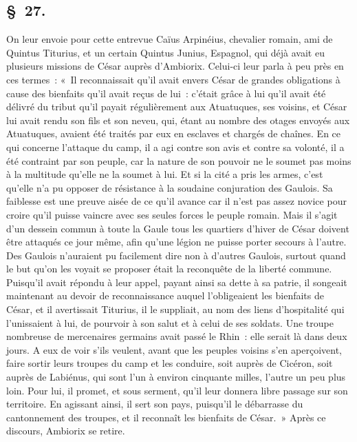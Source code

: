 \documentclass[french,twoside]{book} %
\begin{document}
\subsection[{§ 27.}]{ \textsc{§ 27.} }
\noindent On leur envoie pour cette entrevue Caïus Arpinéius, chevalier romain, ami de Quintus Titurius, et un certain Quintus Junius, Espagnol, qui déjà avait eu plusieurs missions de César auprès d’Ambiorix. Celui-ci leur parla à peu près en ces termes : « Il reconnaissait qu’il avait envers César de grandes obligations à cause des bienfaits qu’il avait reçus de lui : c’était grâce à lui qu’il avait été délivré du tribut qu’il payait régulièrement aux Atuatuques, ses voisins, et César lui avait rendu son fils et son neveu, qui, étant au nombre des otages envoyés aux Atuatuques, avaient été traités par eux en esclaves et chargés de chaînes. En ce qui concerne l’attaque du camp, il a agi contre son avis et contre sa volonté, il a été contraint par son peuple, car la nature de son pouvoir ne le soumet pas moins à la multitude qu’elle ne la soumet à lui. Et si la cité a pris les armes, c’est qu’elle n’a pu opposer de résistance à la soudaine conjuration des Gaulois. Sa faiblesse est une preuve aisée de ce qu’il avance car il n’est pas assez novice pour croire qu’il puisse vaincre avec ses seules forces le peuple romain. Mais il s’agit d’un dessein commun à toute la Gaule tous les quartiers d’hiver de César doivent être attaqués ce jour même, afin qu’une légion ne puisse porter secours à l’autre. Des Gaulois n’auraient pu facilement dire non à d’autres Gaulois, surtout quand le but qu’on les voyait se proposer était la reconquête de la liberté commune. Puisqu’il avait répondu à leur appel, payant ainsi sa dette à sa patrie, il songeait maintenant au devoir de reconnaissance auquel l’obligeaient les bienfaits de César, et il avertissait Titurius, il le suppliait, au nom des liens d’hospitalité qui l’unissaient à lui, de pourvoir à son salut et à celui de ses soldats. Une troupe nombreuse de mercenaires germains avait passé le Rhin : elle serait là dans deux jours. A eux de voir s’ils veulent, avant que les peuples voisins s’en aperçoivent, faire sortir leurs troupes du camp et les conduire, soit auprès de Cicéron, soit auprès de Labiénus, qui sont l’un à environ cinquante milles, l’autre un peu plus loin. Pour lui, il promet, et sous serment, qu’il leur donnera libre passage sur son territoire. En agissant ainsi, il sert son pays, puisqu’il le débarrasse du cantonnement des troupes, et il reconnaît les bienfaits de César. » Après ce discours, Ambiorix se retire.
\end{document}
